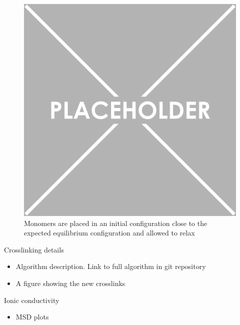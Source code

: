\documentclass{article}
\begin{document}
        \begin{figure}
		\centering
		\includegraphics{placeholder.png}
                \caption{Monomers are placed in an initial configuration close to the expected equilibrium configuration and allowed to relax}
                \label{fig:initial}
        \end{figure}

	\noindent Crosslinking details
	\begin{itemize}
		\item Algorithm description. Link to full algorithm in git repository
		\item A figure showing the new crosslinks
	\end{itemize}
	
	\noindent Ionic conductivity %
	\begin{itemize}
		\item MSD plots
	\end{itemize}
\end{document}

